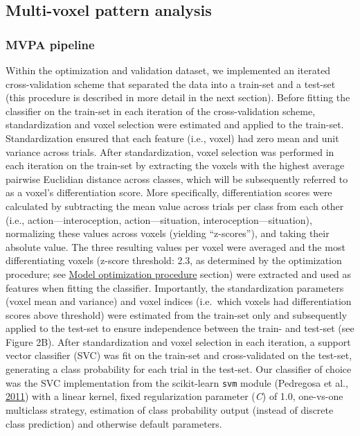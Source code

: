 \documentclass[11pt,american,a4paper,oneside,]{memoir} %
\begin{document}
\hypertarget{shared-states-methods-mvpa}{%
\subsection{Multi-voxel pattern analysis}\label{shared-states-methods-mvpa}}

\hypertarget{shared-states-methods-mvpa-pipeline}{%
\subsubsection{MVPA pipeline}\label{shared-states-methods-mvpa-pipeline}}

Within the optimization and validation dataset, we implemented an iterated cross-validation scheme that separated the data into a train-set and a test-set (this procedure is described in more detail in the next section). Before fitting the classifier on the train-set in each iteration of the cross-validation scheme, standardization and voxel selection were estimated and applied to the train-set. Standardization ensured that each feature (i.e., voxel) had zero mean and unit variance across trials. After standardization, voxel selection was performed in each iteration on the train-set by extracting the voxels with the highest average pairwise Euclidian distance across classes, which will be subsequently referred to as a voxel's differentiation score. More specifically, differentiation scores were calculated by subtracting the mean value across trials per class from each other (i.e., action---interoception, action---situation, interoception---situation), normalizing these values across voxels (yielding ``z-scores''), and taking their absolute value. The three resulting values per voxel were averaged and the most differentiating voxels (z-score threshold: 2.3, as determined by the optimization procedure; see \protect\hyperlink{shared-states-methods-model-optimization-procedure}{Model optimization procedure} section) were extracted and used as features when fitting the classifier. Importantly, the standardization parameters (voxel mean and variance) and voxel indices (i.e.~which voxels had differentiation scores above threshold) were estimated from the train-set only and subsequently applied to the test-set to ensure independence between the train- and test-set (see Figure 2B). After standardization and voxel selection in each iteration, a support vector classifier (SVC) was fit on the train-set and cross-validated on the test-set, generating a class probability for each trial in the test-set. Our classifier of choice was the SVC implementation from the scikit-learn \texttt{svm} module (Pedregosa et al., \protect\hyperlink{ref-pedregosa2011scikit}{2011}) with a linear kernel, fixed regularization parameter (\emph{C}) of 1.0, one-vs-one multiclass strategy, estimation of class probability output (instead of discrete class prediction) and otherwise default parameters.
\end{document}
